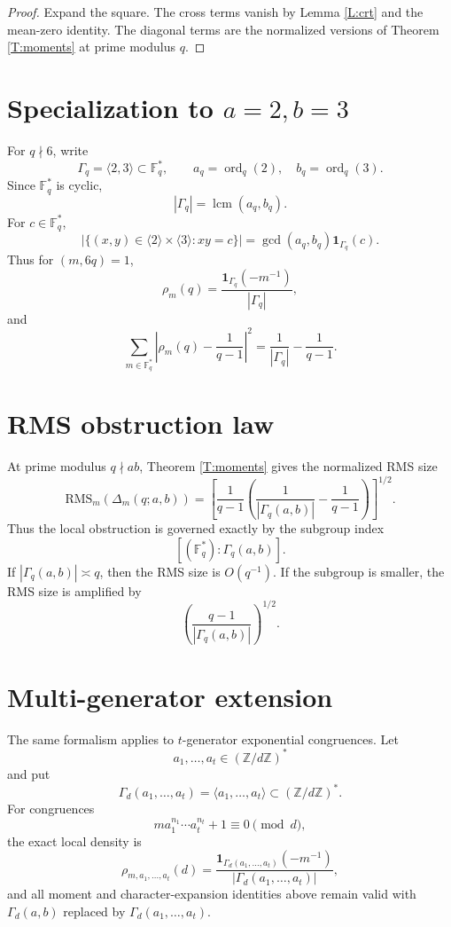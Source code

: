 \documentclass[11pt]{article}
\newcommand{\Z}{\mathbb Z}
\newcommand{\F}{\mathbb F}
\newcommand{\1}{\mathbf 1}
\newcommand{\ord}{\operatorname{ord}}
\newcommand{\lcm}{\operatorname{lcm}}
\begin{document}
\begin{proof}
Expand the square.  The cross terms vanish by Lemma \ref{L:crt} and the mean-zero identity.  The diagonal terms are the normalized versions of Theorem \ref{T:moments} at prime modulus \(q\).
\end{proof}

\section{Specialization to \(a=2,b=3\)}

For \(q\nmid6\), write
\[
\Gamma_q=\langle2,3\rangle\subset\F_q^*,
\qquad
a_q=\ord_q(2),\quad b_q=\ord_q(3).
\]
Since \(\F_q^*\) is cyclic,
\[
|\Gamma_q|=\lcm(a_q,b_q).
\]
For \(c\in\F_q^*\),
\[
|\{(x,y)\in\langle2\rangle\times\langle3\rangle:xy=c\}|
=
\gcd(a_q,b_q)\1_{\Gamma_q}(c).
\]
Thus for \((m,6q)=1\),
\[
\rho_m(q)=\frac{\1_{\Gamma_q}(-m^{-1})}{|\Gamma_q|},
\]
and
\[
\sum_{m\in\F_q^*}\left|
\rho_m(q)-\frac1{q-1}
\right|^2
=
\frac1{|\Gamma_q|}-\frac1{q-1}.
\]


\section{RMS obstruction law}

At prime modulus \(q\nmid ab\), Theorem \ref{T:moments} gives the normalized RMS size
\[
\mathrm{RMS}_m(\Delta_m(q;a,b))
=
\left[
\frac1{q-1}\left(
\frac1{|\Gamma_q(a,b)|}-\frac1{q-1}
\right)
\right]^{1/2}.
\]
Thus the local obstruction is governed exactly by the subgroup index
\[
[(\F_q^*):\Gamma_q(a,b)].
\]
If \(|\Gamma_q(a,b)|\asymp q\), then the RMS size is \(O(q^{-1})\). If the subgroup is smaller, the RMS size is amplified by
\[
\left(\frac{q-1}{|\Gamma_q(a,b)|}\right)^{1/2}.
\]

\section{Multi-generator extension}

The same formalism applies to \(t\)-generator exponential congruences. Let
\[
a_1,\dots,a_t\in(\Z/d\Z)^*
\]
and put
\[
\Gamma_d(a_1,\dots,a_t)=\langle a_1,\dots,a_t\rangle\subset(\Z/d\Z)^*.
\]
For congruences
\[
m a_1^{n_1}\cdots a_t^{n_t}+1\equiv0\pmod d,
\]
the exact local density is
\[
\rho_{m,a_1,\dots,a_t}(d)
=
\frac{\1_{\Gamma_d(a_1,\dots,a_t)}(-m^{-1})}{|\Gamma_d(a_1,\dots,a_t)|},
\]
and all moment and character-expansion identities above remain valid with \(\Gamma_d(a,b)\) replaced by \(\Gamma_d(a_1,\dots,a_t)\).
\end{document}
